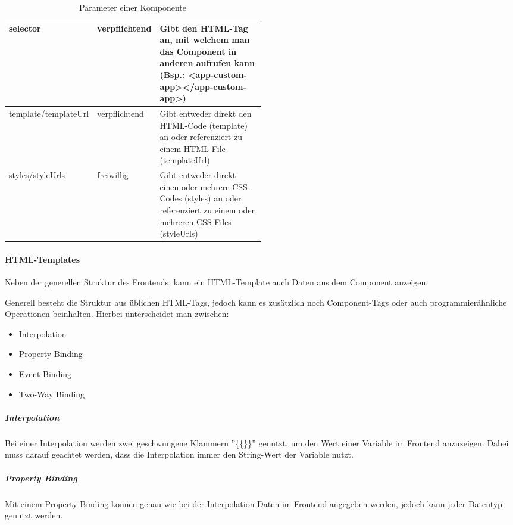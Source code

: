 \begin{table}[H]
    \centering
    \begin{tabular}{|l|l|p{0.5\linewidth}|}
        \hline
        selector             & verpflichtend & Gibt den HTML-Tag an, mit welchem man das Component in anderen aufrufen kann (Bsp.: <app-custom-app></app-custom-app>)       \\ \hline
        template/templateUrl & verpflichtend & Gibt entweder direkt den HTML-Code (template) an oder referenziert zu einem HTML-File (templateUrl)                          \\ \hline
        styles/styleUrls     & freiwillig    & Gibt entweder direkt einen oder mehrere CSS-Codes (styles) an oder referenziert zu einem oder mehreren CSS-Files (styleUrls) \\ \hline
    \end{tabular}
    \caption{Parameter einer Komponente}
\end{table}

\paragraph{HTML-Templates}

Neben der generellen Struktur des Frontends, kann ein HTML-Template auch Daten aus dem Component anzeigen.



Generell besteht die Struktur aus üblichen HTML-Tags, jedoch kann es zusätzlich noch Component-Tags oder auch programmierähnliche Operationen beinhalten. Hierbei unterscheidet man zwischen:

\begin{itemize}
    \item Interpolation
    \item Property Binding
    \item Event Binding
    \item Two-Way Binding
\end{itemize}


\subparagraph{Interpolation} Bei einer Interpolation werden zwei geschwungene Klammern ''\{\{\}\}'' genutzt, um den Wert einer Variable im Frontend anzuzeigen. Dabei muss darauf geachtet werden, dass die Interpolation immer den String-Wert der Variable nutzt. \cite{ANG-IN}

\subparagraph{Property Binding} Mit einem Property Binding können genau wie bei der Interpolation Daten im Frontend angegeben werden, jedoch kann jeder Datentyp genutzt werden.

